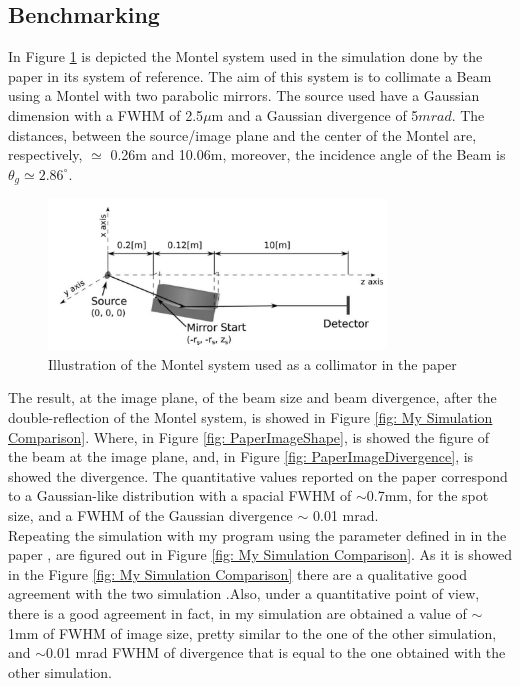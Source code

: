 \subsection{Benchmarking} 
In Figure \ref{fig: PaperMontelSystem} is depicted the Montel system used in the simulation done by the paper in its system of reference. The aim of this system is to collimate a Beam using a Montel with two parabolic mirrors. The source used have a Gaussian dimension with a FWHM of 2.5$\mu $m and a Gaussian divergence of 5$mrad $. The distances, between the source/image plane and the center of the Montel are, respectively,  $\simeq $ 0.26m and 10.06m, moreover, the incidence angle of the Beam is $\theta_g \simeq 2.86^{\circ} $.
%
\begin{figure}[]
	\centering
		\includegraphics[width=0.8\textwidth]{Immagini/Chapter4/PaperMontelSystem}
		\caption{Illustration of the Montel system used as a collimator in the paper \cite{resta2015nested}}
		\label{fig: PaperMontelSystem}
\end{figure}
%
The result, at the image plane, of the beam size and beam divergence, after the double-reflection of the Montel system, is showed in Figure \ref{fig: My Simulation Comparison}. Where, in Figure \ref{fig: PaperImageShape}, is showed the figure of the beam at the image plane, and, in Figure \ref{fig: PaperImageDivergence}, is showed the divergence. The quantitative values reported on the paper correspond to a Gaussian-like distribution with a spacial FWHM of $\sim $0.7mm, for the spot size, and a FWHM of the Gaussian divergence $\sim $ 0.01 mrad.
\\
Repeating the simulation with my program using the parameter defined in  in the paper \cite{resta2015nested}, are figured out in Figure \ref{fig: My Simulation Comparison}. As it is showed in the Figure \ref{fig: My Simulation Comparison} there are a qualitative good agreement with the two simulation .Also, under a quantitative point of view, there is a good agreement in fact, in my simulation are obtained a value of $\sim $1mm of FWHM of image size, pretty similar to the one of the other simulation, and $\sim $0.01 mrad FWHM of divergence that is equal to the one obtained with the other simulation.
